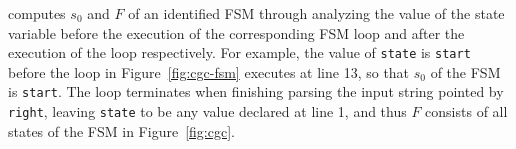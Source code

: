 \Tool{} computes $s_0$ and $F$ of an identified FSM through analyzing the value of 
the state variable before the execution of the corresponding
FSM loop and after the execution of the loop respectively. 
For example, the value of \texttt{state} is \texttt{start} before 
the loop in Figure~\ref{fig:cgc-fsm} executes at line 13, 
so that $s_0$ of the FSM is \texttt{start}.
The loop terminates when finishing 
parsing the input string pointed by \texttt{right},
leaving \texttt{state} to be any value declared at line 1, 
and thus $F$ consists of all states of the FSM in Figure~\ref{fig:cgc}. 









